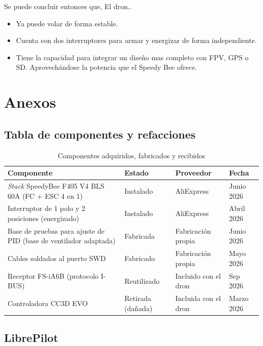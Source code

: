 \documentclass[pdflatex,sn-mathphys-num]{sn-jnl}%
\begin{document}
Se puede concluir entonces que, El dron..
\begin{itemize}
    \item Ya puede volar de forma estable.
    \item Cuenta con dos interruptores para armar y energizar de forma independiente.
    \item Tiene la capacidad para integrar un diseño mas completo con FPV, GPS o SD. Aprovechándose la potencia que el Speedy Bee ofrece.
\end{itemize}

\section{Anexos}

\appendix
\renewcommand{\thesubsection}{\Roman{subsection}}

\subsection{Tabla de componentes y refacciones \label{sec:TablaComponentes}}
\begin{table}[!ht]
\centering
\caption{Componentes adquiridos, fabricados y recibidos}
\label{tab:componentes}
\begin{tabular}{p{4.6cm}p{2.2cm}p{2.2cm}p{1.8cm}}
\hline
Componente & Estado & Proveedor  & Fecha \\
\hline
\textit{Stack} SpeedyBee F405 V4 BLS 60A (FC + ESC 4 en 1) & Instalado & AliExpress  & Junio 2026 \\
Interruptor de 1 polo y 2 posiciones (energizado) & Instalado   & AliExpress & Abril 2026 \\
Base de pruebas para ajuste de PID (base de ventilador adaptada) & Fabricada & Fabricación propia  & Junio 2026 \\
Cables soldados al puerto SWD & Fabricado & Fabricación propia  & Mayo 2026 \\
Receptor FS-iA6B (protocolo I-BUS) & Reutilizado & Incluido con el dron  & Sep 2026 \\
Controladora CC3D EVO & Retirada (dañada) & Incluida con el dron  & Marzo 2026 \\
\hline
\end{tabular}
\end{table}
\newpage
\subsection{LibrePilot}
\end{document}
